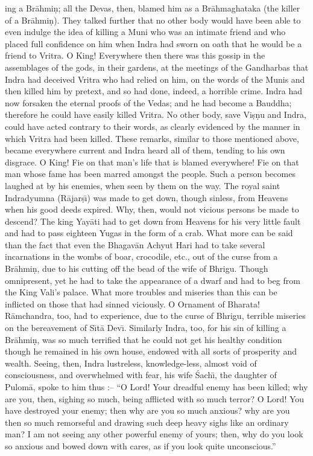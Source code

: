 ing a Br\=ahmi\d{n}; all the Devas, then, blamed him as a Br\=ahmaghataka (the killer of a Br\=ahmi\d{n}). They talked further that no other body would have been able to even indulge the idea of killing a Muni who was an intimate friend and who placed full confidence on him when Indra had sworn on oath that he would be a friend to Vritra. O King! Everywhere then there was this gossip in the assemblages of the gods, in their gardens, at the meetings of the Gandharbas that Indra had deceived Vritra who had relied on him, on the words of the Munis and then killed him by pretext, and so had done, indeed, a horrible crime. Indra had now forsaken the eternal proofs of the Vedas; and he had become a Bauddha; therefore he could have easily killed Vritra. No other body, save Vi\d{s}\d{n}u and Indra, could have acted contrary to their words, as clearly evidenced by the manner in which Vritra had been killed. These remarks, similar to those mentioned above, became everywhere current and Indra heard all of them, tending to his own disgrace. O King! Fie on that man's life that is blamed everywhere! Fie on that man whose fame has been marred amongst the people. Such a person becomes laughed at by his enemies, when seen by them on the way. The royal saint Indradyumna (R\=ajar\d{s}\={\i}) was made to get down, though sinless, from Heavens when his good deeds expired. Why, then, would not vicious persons be made to descend? The king Yay\=ati had to get down from Heavens for his very little fault and had to pass eighteen Yugas in the form of a crab. What more can be said than the fact that even the Bhagav\=an Achyut Hari had to take several incarnations in the wombs of boar, crocodile, etc., out of the curse from a Br\=ahmi\d{n}, due to his cutting off the bead of the wife of Bhrigu. Though omnipresent, yet he had to take the appearance of a dwarf and had to beg from the King Vali's palace. What more troubles and miseries than this can be inflicted on those that had sinned viciously. O Ornament of Bharata! R\=amchandra, too, had to experience, due to the curse of Bhrigu, terrible miseries on the bereavement of S\={\i}t\=a Dev\={\i}. Similarly Indra, too, for his sin of killing a Br\=ahmi\d{n}, was so much terrified that he could not get his healthy condition though he remained in his own house, endowed with all sorts of prosperity and wealth. Seeing, then, Indra lustreless, knowledge-less, almost void of consciousness, and overwhelmed with fear, his wife \'Sach\={\i}, the daughter of Pulom\=a, spoke to him thus :-- ``O Lord! Your dreadful enemy has been killed; why are you, then, sighing so much, being afflicted with so much terror? O Lord! You have destroyed your enemy; then why are you so much anxious? why are you then so much remorseful and drawing such deep heavy sighs like an ordinary man? I am not seeing any other powerful enemy of yours; then, why do you look so anxious and bowed down with cares, as if you look quite unconscious.''

